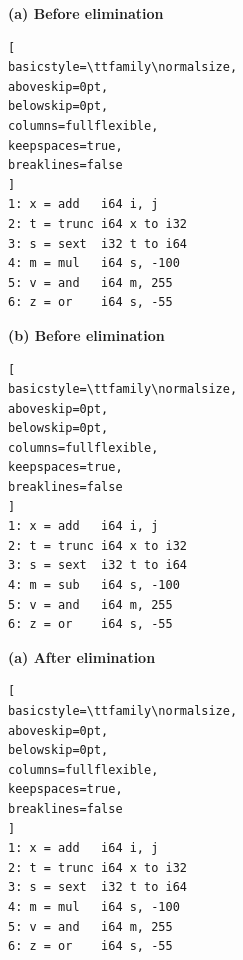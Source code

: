 \par\vspace{1.2em}
\begin{center}
\hspace*{0.8cm}
\begin{minipage}{0.90\textwidth}


\begin{minipage}[t]{0.46\linewidth}
\raggedright

{\ttfamily\normalsize
\textbf{(a) Before elimination}\par}

\begin{lstlisting}[
basicstyle=\ttfamily\normalsize,
aboveskip=0pt,
belowskip=0pt,
columns=fullflexible,
keepspaces=true,
breaklines=false
]
1: x = add   i64 i, j
2: t = trunc i64 x to i32
3: s = sext  i32 t to i64
4: m = mul   i64 s, -100
5: v = and   i64 m, 255
6: z = or    i64 s, -55
\end{lstlisting}

\end{minipage}
\hfill
\begin{minipage}[t]{0.46\linewidth}
\raggedright

{\ttfamily\normalsize
\textbf{(b) Before elimination}\par}

\begin{lstlisting}[
basicstyle=\ttfamily\normalsize,
aboveskip=0pt,
belowskip=0pt,
columns=fullflexible,
keepspaces=true,
breaklines=false
]
1: x = add   i64 i, j
2: t = trunc i64 x to i32
3: s = sext  i32 t to i64
4: m = sub   i64 s, -100
5: v = and   i64 m, 255
6: z = or    i64 s, -55

\end{lstlisting}

\end{minipage}

\vspace{1.0em}


\begin{minipage}[t]{0.46\linewidth}
\raggedright

{\ttfamily\normalsize
\textbf{(a) After elimination}\par}

\begin{lstlisting}[
basicstyle=\ttfamily\normalsize,
aboveskip=0pt,
belowskip=0pt,
columns=fullflexible,
keepspaces=true,
breaklines=false
]
1: x = add   i64 i, j
2: t = trunc i64 x to i32
3: s = sext  i32 t to i64
4: m = mul   i64 s, -100
5: v = and   i64 m, 255
6: z = or    i64 s, -55


\end{lstlisting}
\end{minipage}
\end{minipage}
\end{center}
